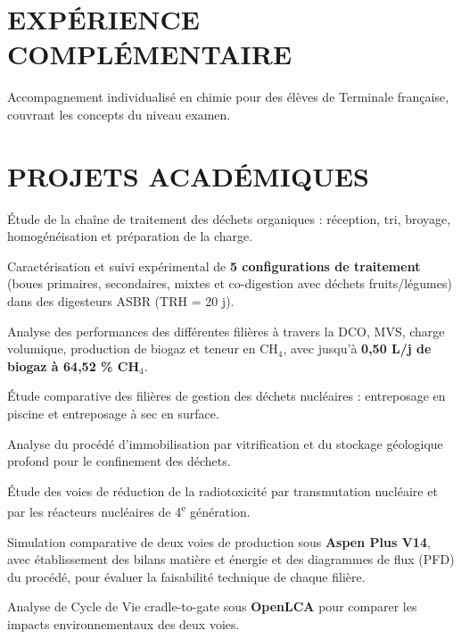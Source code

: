 \documentclass[10pt]{article}
\begin{document}
\section{EXPÉRIENCE COMPLÉMENTAIRE}
\begin{bul}
\item Accompagnement individualisé en chimie pour des élèves de Terminale française, couvrant les concepts du niveau examen.
\end{bul}

\section{PROJETS ACADÉMIQUES}
\begin{bul}
\item Étude de la chaîne de traitement des déchets organiques : réception, tri, broyage, homogénéisation et préparation de la charge.
\item Caractérisation et suivi expérimental de \textbf{5 configurations de traitement} (boues primaires, secondaires, mixtes et co-digestion avec déchets fruits/légumes) dans des digesteurs ASBR (TRH = 20 j).
\item Analyse des performances des différentes filières à travers la DCO, MVS, charge volumique, production de biogaz et teneur en CH$_4$, avec jusqu'à \textbf{0,50 L/j de biogaz à 64,52 \% CH$_4$}.
\end{bul}
\begin{bul}
\item Étude comparative des filières de gestion des déchets nucléaires : entreposage en piscine et entreposage à sec en surface.
\item Analyse du procédé d'immobilisation par vitrification et du stockage géologique profond pour le confinement des déchets.
\item Étude des voies de réduction de la radiotoxicité par transmutation nucléaire et par les réacteurs nucléaires de 4\textsuperscript{e} génération.
\end{bul}
\begin{bul}
\item Simulation comparative de deux voies de production sous \textbf{Aspen Plus V14}, avec établissement des bilans matière et énergie et des diagrammes de flux (PFD) du procédé, pour évaluer la faisabilité technique de chaque filière.
\item Analyse de Cycle de Vie cradle-to-gate sous \textbf{OpenLCA} pour comparer les impacts environnementaux des deux voies.
\end{bul}
\end{document}
